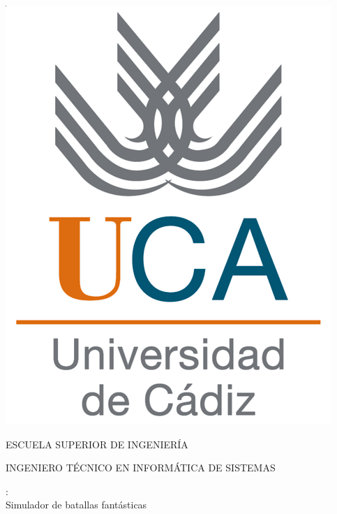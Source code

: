 %



\pagestyle{empty}
\begin{center}

  \includegraphics[scale=0.2]{./imagenes/logo_uca.png} \\

  \vspace{2.0cm}

  \Large{ESCUELA SUPERIOR DE INGENIERÍA} \\

  \vspace{1.0cm}

  \large{INGENIERO TÉCNICO EN INFORMÁTICA DE SISTEMAS} \\

  \vspace{2.0cm}

  \large{\gomf:\\ Simulador de batallas fantásticas} \\

  \vspace{1.0cm}

\end{center}

